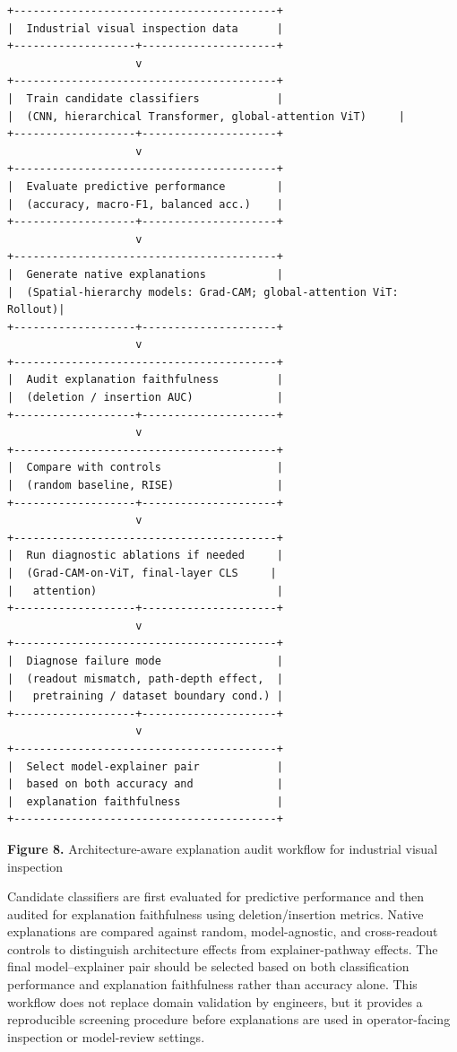 \documentclass[11pt,a4paper]{article}
\begin{document}
\begin{Verbatim}
+-----------------------------------------+
|  Industrial visual inspection data      |
+-------------------+---------------------+
                    v
+-----------------------------------------+
|  Train candidate classifiers            |
|  (CNN, hierarchical Transformer, global-attention ViT)     |
+-------------------+---------------------+
                    v
+-----------------------------------------+
|  Evaluate predictive performance        |
|  (accuracy, macro-F1, balanced acc.)    |
+-------------------+---------------------+
                    v
+-----------------------------------------+
|  Generate native explanations           |
|  (Spatial-hierarchy models: Grad-CAM; global-attention ViT: Rollout)|
+-------------------+---------------------+
                    v
+-----------------------------------------+
|  Audit explanation faithfulness         |
|  (deletion / insertion AUC)             |
+-------------------+---------------------+
                    v
+-----------------------------------------+
|  Compare with controls                  |
|  (random baseline, RISE)                |
+-------------------+---------------------+
                    v
+-----------------------------------------+
|  Run diagnostic ablations if needed     |
|  (Grad-CAM-on-ViT, final-layer CLS     |
|   attention)                            |
+-------------------+---------------------+
                    v
+-----------------------------------------+
|  Diagnose failure mode                  |
|  (readout mismatch, path-depth effect,  |
|   pretraining / dataset boundary cond.) |
+-------------------+---------------------+
                    v
+-----------------------------------------+
|  Select model-explainer pair            |
|  based on both accuracy and             |
|  explanation faithfulness               |
+-----------------------------------------+
\end{Verbatim}

\begin{center}
\small \textbf{Figure 8.} Architecture-aware explanation audit workflow for industrial visual inspection
\end{center}

Candidate classifiers are first evaluated for predictive performance and then audited for explanation faithfulness using deletion/insertion metrics. Native explanations are compared against random, model-agnostic, and cross-readout controls to distinguish architecture effects from explainer-pathway effects. The final model--explainer pair should be selected based on both classification performance and explanation faithfulness rather than accuracy alone. This workflow does not replace domain validation by engineers, but it provides a reproducible screening procedure before explanations are used in operator-facing inspection or model-review settings.
\end{document}
